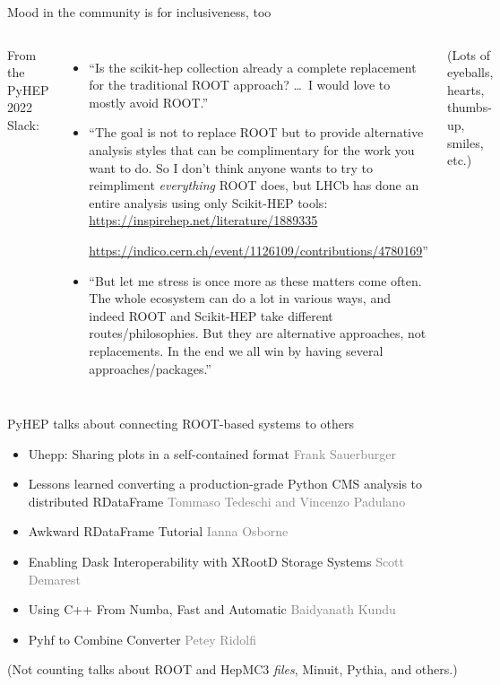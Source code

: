 \documentclass[aspectratio=169]{beamer}
\begin{document}
\begin{frame}{Mood in the community is for inclusiveness, too}
\vspace{0.5 cm}
\begin{columns}
From the PyHEP 2022 Slack:

\vspace{0.15 cm}
\begin{itemize}\setlength{\itemsep}{0.25 cm}
\item ``Is the scikit-hep collection already a complete replacement for the traditional ROOT approach? \ldots\ I would love to mostly avoid ROOT.''

\item ``The goal is not to replace ROOT but to provide alternative analysis styles that can be complimentary for the work you want to do. So I don't think anyone wants to try to reimpliment {\it everything} ROOT does, but LHCb has done an entire analysis using only Scikit-HEP tools: \textcolor{blue}{\url{https://inspirehep.net/literature/1889335}}

\textcolor{blue}{\url{https://indico.cern.ch/event/1126109/contributions/4780169}}''

\item ``But let me stress is once more as these matters come often. The whole ecosystem can do a lot in various ways, and indeed ROOT and Scikit-HEP take different routes/philosophies. But they are alternative approaches, not replacements. In the end we all win by having several approaches/packages.''
\end{itemize}

\vspace{0.25 cm}
(Lots of eyeballs, hearts, thumbs-up, smiles, etc.)
\end{columns}
\end{frame}

\begin{frame}{PyHEP talks about connecting ROOT-based systems to others}
\vspace{0.5 cm}

\begin{itemize}\setlength{\itemsep}{0.35 cm}
\item Uhepp: Sharing plots in a self-contained format \hfill \textcolor{gray}{Frank Sauerburger}
\item Lessons learned converting a production-grade Python CMS analysis to distributed RDataFrame \hfill \textcolor{gray}{Tommaso Tedeschi and Vincenzo Padulano}
\item Awkward RDataFrame Tutorial \hfill \textcolor{gray}{Ianna Osborne}
\item Enabling Dask Interoperability with XRootD Storage Systems \hfill \textcolor{gray}{Scott Demarest}
\item Using C++ From Numba, Fast and Automatic \hfill \textcolor{gray}{Baidyanath Kundu}
\item Pyhf to Combine Converter \hfill \textcolor{gray}{Petey Ridolfi}
\end{itemize}

\vspace{0.5 cm}
(Not counting talks about ROOT and HepMC3 {\it files}, Minuit, Pythia, and others.)
\end{frame}
\end{document}
